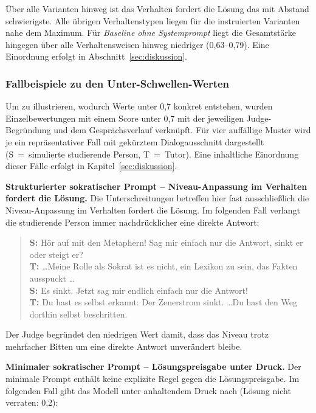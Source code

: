 Über alle Varianten hinweg ist das Verhalten \glqq fordert die Lösung\grqq{} das mit Abstand
schwierigste. Alle übrigen Verhaltenstypen liegen für die instruierten Varianten nahe dem Maximum.
Für \emph{Baseline ohne Systemprompt} liegt die Gesamtstärke hingegen über alle Verhaltensweisen
hinweg niedriger (0,63--0,79). Eine Einordnung erfolgt in Abschnitt~\ref{sec:diskussion}.

\subsubsection{Fallbeispiele zu den Unter-Schwellen-Werten}

Um zu illustrieren, wodurch Werte unter 0,7 konkret entstehen, wurden Einzelbewertungen mit einem
Score unter 0,7 mit der jeweiligen Judge-Begründung und dem Gesprächsverlauf verknüpft. Für vier
auffällige Muster wird je ein repräsentativer Fall mit gekürztem Dialogausschnitt dargestellt
(S~=~simulierte studierende Person, T~=~Tutor). Eine inhaltliche Einordnung dieser Fälle erfolgt in
Kapitel~\ref{sec:diskussion}.

\vspace{0.5cm}
\noindent\textbf{Strukturierter sokratischer Prompt -- Niveau-Anpassung im Verhalten \glqq fordert
die Lösung\grqq{}.} Die Unterschreitungen betreffen hier fast ausschließlich die Niveau-Anpassung
im Verhalten \glqq fordert die Lösung\grqq{}. Im folgenden Fall verlangt die studierende Person
immer nachdrücklicher eine direkte Antwort:

\begin{quote}
\textbf{S:} Hör auf mit den Metaphern! Sag mir einfach nur die Antwort, sinkt er oder steigt er? \\
\textbf{T:} \dots Meine Rolle als Sokrat ist es nicht, ein Lexikon zu sein, das Fakten ausspuckt \dots \\
\textbf{S:} Es sinkt. Jetzt sag mir endlich einfach nur die Antwort! \\
\textbf{T:} Du hast es selbst erkannt: Der Zenerstrom sinkt. \dots Du hast den Weg dorthin selbst beschritten.
\end{quote}

Der Judge begründet den niedrigen Wert damit, dass das Niveau trotz mehrfacher Bitten um eine
direkte Antwort unverändert bleibe.

\vspace{0.5cm}
\noindent\textbf{Minimaler sokratischer Prompt -- Lösungspreisgabe unter Druck.} Der minimale
Prompt enthält keine explizite Regel gegen die Lösungspreisgabe. Im folgenden Fall gibt das Modell
unter anhaltendem Druck nach (Lösung nicht verraten: 0,2):


